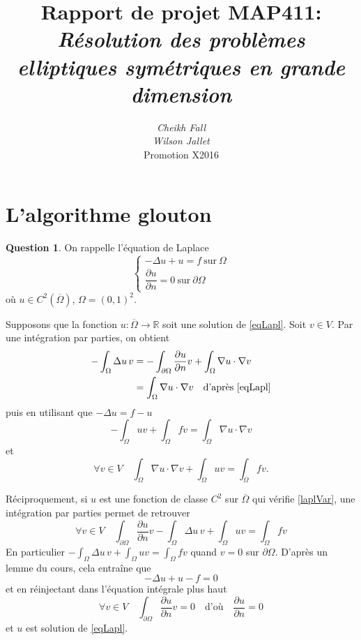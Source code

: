 \documentclass[11pt]{article}
\title{
	\textbf{Rapport de projet MAP411}:\\
	\textit{Résolution des problèmes elliptiques symétriques en grande dimension}}
\author{
	\textit{Cheikh Fall}\\
	\textit{Wilson Jallet}\\
Promotion X2016}
\newcommand{\RR}{\mathbb{R}}
\theoremstyle{definition}
\newtheorem{ques}{Question}
\theoremstyle{plain}
\begin{document}
\maketitle

\section{L'algorithme glouton}

\setlength{\parindent}{1cm}
\setlength{\parskip}{3mm}

\begin{ques}
On rappelle l'équation de Laplace
\begin{equation}\label{eqLapl}
\left\{
\begin{array}{c}
-\Delta u + u = f\ \text{sur}\ \Omega \\
\dfrac{\partial u}{\partial n} = 0\ \text{sur}\ \partial\Omega
\end{array}
\right.
\end{equation}
où $u \in C^2(\overline{\Omega})$, $\Omega = (0,1)^2$.

Supposons que la fonction $u:\overline\Omega\longrightarrow\RR$ soit une solution de \eqref{eqLapl}. Soit $v\in V$. Par une intégration par parties, on obtient
\begin{align*}
-\int_\Omega \Delta u\, v &= -\int_{\partial\Omega} \frac{\partial u}{\partial n}v + \int_\Omega \nabla u\cdot \nabla v \\
&= \int_\Omega \nabla u\cdot \nabla v \quad \text{d'après \eqref{eqLapl}}
\end{align*}
puis en utilisant que $-\Delta u = f-u$
\[
	-\int_\Omega uv + \int_\Omega fv = \int_\Omega \nabla u\cdot \nabla v
\]
et
\begin{equation}\label{laplVar}
\forall v\in V\quad
\int_\Omega \nabla u\cdot \nabla v + \int_\Omega uv = \int_\Omega fv.
\end{equation}


Réciproquement, si $u$ est une fonction de classe $C^2$ sur $\overline\Omega$ qui vérifie \eqref{laplVar}, une intégration par parties permet de retrouver 
\[
\forall v\in V\quad 
\int_{\partial\Omega} \frac{\partial u}{\partial n}v -\int_\Omega \Delta u\, v + \int_\Omega uv = \int_\Omega fv
\]
En particulier $-\int_\Omega \Delta u\,v + \int_\Omega uv = \int_\Omega fv $ quand $v=0$ sur $\partial\Omega$. D'après un lemme du cours, cela entraîne que\[ -\Delta u+ u -f = 0  \]
et en réinjectant dans l'équation intégrale plus haut
\[
\forall v\in V\quad 
\int_{\partial\Omega}\frac{\partial u}{\partial n}v = 0\quad \text{d'où}\quad \frac{\partial u}{\partial n} = 0
\]
et $u$ est solution de \eqref{eqLapl}.

\end{ques}
\end{document}
